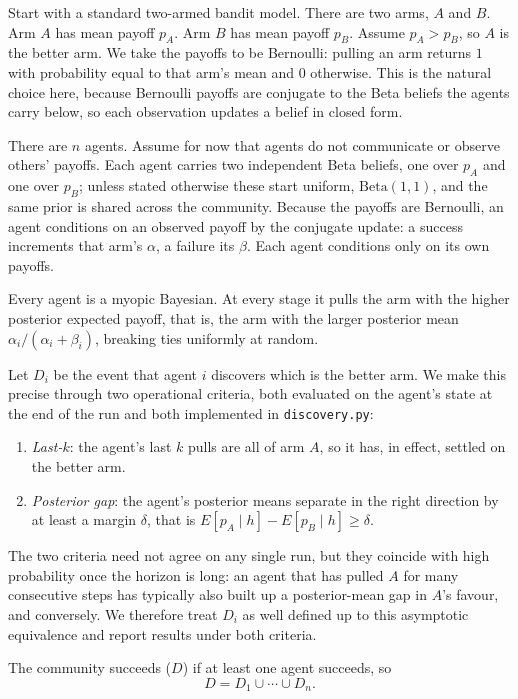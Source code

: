 \documentclass[12pt]{article}
\begin{document}
Start with a standard two-armed bandit model.
There are two arms, $A$ and $B$.
Arm $A$ has mean payoff $p_A$.
Arm $B$ has mean payoff $p_B$.
Assume $p_A > p_B$, so $A$ is the better arm.
We take the payoffs to be Bernoulli: pulling an arm returns $1$ with probability equal to that arm's mean and $0$ otherwise. This is the natural choice here, because Bernoulli payoffs are conjugate to the Beta beliefs the agents carry below, so each observation updates a belief in closed form.

There are $n$ agents.
Assume for now that agents do not communicate or observe others' payoffs.
Each agent carries two independent Beta beliefs, one over $p_A$ and one over $p_B$; unless stated otherwise these start uniform, $\mathrm{Beta}(1,1)$, and the same prior is shared across the community. Because the payoffs are Bernoulli, an agent conditions on an observed payoff by the conjugate update: a success increments that arm's $\alpha$, a failure its $\beta$. Each agent conditions only on its own payoffs.

Every agent is a myopic Bayesian.
At every stage it pulls the arm with the higher posterior expected payoff, that is, the arm with the larger posterior mean $\alpha_i/(\alpha_i + \beta_i)$, breaking ties uniformly at random.

Let $D_i$ be the event that agent $i$ discovers which is the better arm. We make this precise through two operational criteria, both evaluated on the agent's state at the end of the run and both implemented in \texttt{discovery.py}:
\begin{enumerate}[leftmargin=*]
  \item \emph{Last-$k$}: the agent's last $k$ pulls are all of arm $A$, so it has, in effect, settled on the better arm.
  \item \emph{Posterior gap}: the agent's posterior means separate in the right direction by at least a margin $\delta$, that is $E[p_A \mid h] - E[p_B \mid h] \geq \delta$.
\end{enumerate}
The two criteria need not agree on any single run, but they coincide with high probability once the horizon is long: an agent that has pulled $A$ for many consecutive steps has typically also built up a posterior-mean gap in $A$'s favour, and conversely. We therefore treat $D_i$ as well defined up to this asymptotic equivalence and report results under both criteria.

The community succeeds ($D$) if at least one agent succeeds, so
\[
  D = D_1 \cup \cdots \cup D_n.
\]
\end{document}
